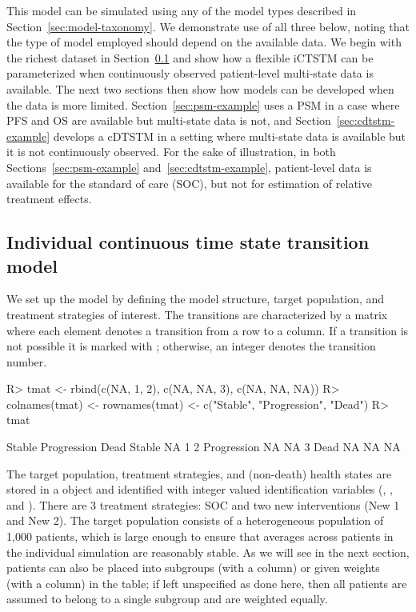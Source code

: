 \documentclass[article, nojss]{jss}\usepackage[]{graphicx}\usepackage[]{color}
\begin{document}
This model can be simulated using any of the model types described in Section~\ref{sec:model-taxonomy}. We demonstrate use of all three below, noting that the type of model employed should depend on the available data. We begin with the richest dataset in Section~\ref{sec:ictstm-example} and show how a flexible iCTSTM can be parameterized when continuously observed patient-level multi-state data is available. The next two sections then show how models can be developed when the data is more limited. Section~\ref{sec:psm-example} uses a PSM in a case where PFS and OS are available but multi-state data is not, and Section~\ref{sec:cdtstm-example} develops a cDTSTM in a setting where multi-state data is available but it is not continuously observed. For the sake of illustration, in both Sections~\ref{sec:psm-example} and~\ref{sec:cdtstm-example}, patient-level data is available for the standard of care (SOC), but not for estimation of relative treatment effects.

\subsection{Individual continuous time state transition model} \label{sec:ictstm-example}
We set up the model by defining the model structure, target population, and treatment strategies of interest. The transitions are characterized by a matrix where each element denotes a transition from a row to a column. If a transition is not possible it is marked with ; otherwise, an integer denotes the transition number.

\begin{Schunk}
\begin{Sinput}
R> tmat <- rbind(c(NA, 1, 2), c(NA, NA, 3), c(NA, NA, NA))
R> colnames(tmat) <- rownames(tmat) <- c("Stable", "Progression", "Dead")
R> tmat
\end{Sinput}
\begin{Soutput}
            Stable Progression Dead
Stable          NA           1    2
Progression     NA          NA    3
Dead            NA          NA   NA
\end{Soutput}
\end{Schunk}

The target population, treatment strategies, and (non-death) health states are stored in a  object and identified with integer valued identification variables (, , and ). There are 3 treatment strategies: SOC and two new interventions (New 1 and New 2). The target population consists of a heterogeneous population of 1,000 patients, which is large enough to ensure that averages across patients in the individual simulation are reasonably stable. As we will see in the next section, patients can also be placed into subgroups (with a  column) or given weights (with a  column) in the  table; if left unspecified as done here, then all patients are assumed to belong to a single subgroup and are weighted equally.
\end{document}
